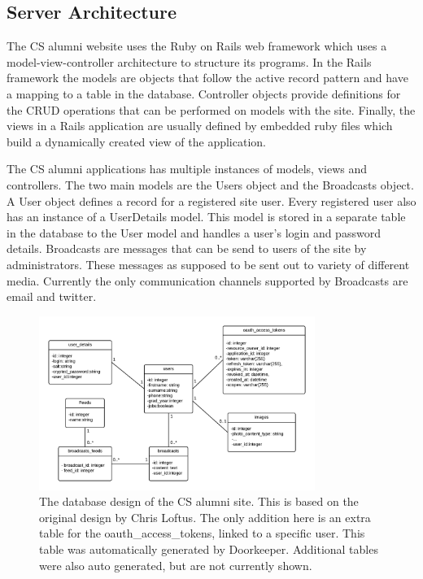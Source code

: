 \documentclass[paper=a4, fontsize=11pt]{scrartcl}	%
\numberwithin{equation}{section}															%
\numberwithin{figure}{section}																%
\numberwithin{table}{section}
\begin{document}
\subsection{Server Architecture}
\label{subsec:server-architecture}
The CS alumni website uses the Ruby on Rails web framework which uses a model-view-controller architecture to structure its programs. In the Rails framework the models are objects that follow the active record pattern and have a mapping to a table in the database. Controller objects provide definitions for the CRUD operations that can be performed on models with the site. Finally, the views in a Rails application are usually defined by embedded ruby files which build a dynamically created view of the application.

The CS alumni applications has multiple instances of models, views and controllers. The two main models are the Users object and the Broadcasts object. A User object defines a record for a registered site user. Every registered user also has an instance of a UserDetails model. This model is stored in a separate table in the database to the User model and handles a user's login and password details. Broadcasts are messages that can be send to users of the site by administrators. These messages as supposed to be sent out to variety of different media. Currently the only communication channels supported by Broadcasts are email and twitter.

\begin{figure}[H]
\centering
\includegraphics[width=0.8\textwidth]{img/database_design.png}
\caption{The database design of the CS alumni site. This is based on the original design by Chris Loftus. The only addition here is an extra table for the oauth\_access\_tokens, linked to a specific user. This table was automatically generated by Doorkeeper. Additional tables were also auto generated, but are not currently shown.}
\label{fig:database-design}
\end{figure}
\end{document}

